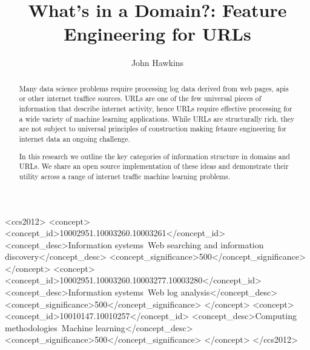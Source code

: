 \documentclass[sigconf]{acmart}
\begin{document}
\title{What's in a Domain?: Feature Engineering for URLs}

\author{John Hawkins}

\renewcommand{\shortauthors}{Hawkins}

\begin{abstract}
Many data science problems require processing log data derived from web pages, apis or other
internet traffice sources. URLs are one of the few universal pieces of information that describe
internet activity, hence URLs require effective processing for a wide variety of machine 
learning applications. While URLs are structurally rich, they are not subject
to universal principles of construction making fetaure engineering for internet data an ongoing challenge.

In this research we outline the key categories of information structure in domains and URLs.
We share an open source implementation of these ideas and demonstrate their utility across a range of 
internet traffic machine learning problems.
\end{abstract}


\begin{CCSXML}
<ccs2012>
<concept>
<concept_id>10002951.10003260.10003261</concept_id>
<concept_desc>Information systems~Web searching and information discovery</concept_desc>
<concept_significance>500</concept_significance>
</concept>
<concept>
<concept_id>10002951.10003260.10003277.10003280</concept_id>
<concept_desc>Information systems~Web log analysis</concept_desc>
<concept_significance>500</concept_significance>
</concept>
<concept>
<concept_id>10010147.10010257</concept_id>
<concept_desc>Computing methodologies~Machine learning</concept_desc>
<concept_significance>500</concept_significance>
</concept>
</ccs2012>
\end{CCSXML}
\end{document}
